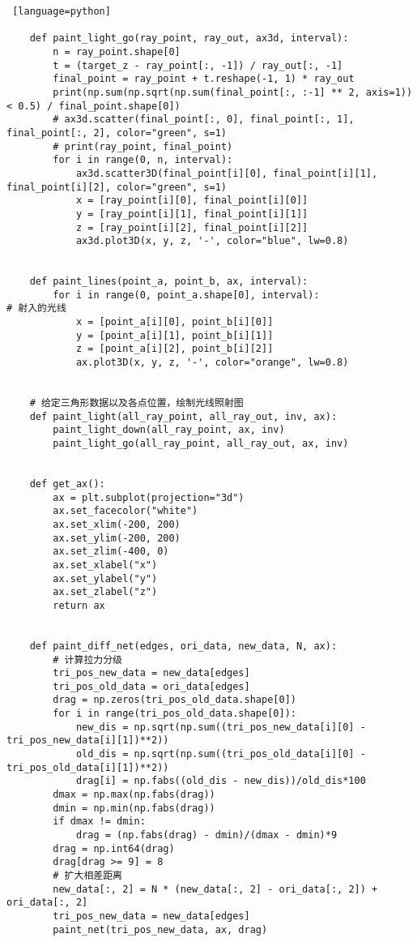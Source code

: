 \documentclass[withoutpreface,bwprint,fontset=macnew]{cumcmthesis} %
\begin{document}
\begin{appendices}
\begin{lstlisting} [language=python]
	
	def paint_light_go(ray_point, ray_out, ax3d, interval):
	    n = ray_point.shape[0]
	    t = (target_z - ray_point[:, -1]) / ray_out[:, -1]
	    final_point = ray_point + t.reshape(-1, 1) * ray_out
	    print(np.sum(np.sqrt(np.sum(final_point[:, :-1] ** 2, axis=1)) < 0.5) / final_point.shape[0])
	    # ax3d.scatter(final_point[:, 0], final_point[:, 1], final_point[:, 2], color="green", s=1)
	    # print(ray_point, final_point)
	    for i in range(0, n, interval):
	        ax3d.scatter3D(final_point[i][0], final_point[i][1], final_point[i][2], color="green", s=1)
	        x = [ray_point[i][0], final_point[i][0]]
	        y = [ray_point[i][1], final_point[i][1]]
	        z = [ray_point[i][2], final_point[i][2]]
	        ax3d.plot3D(x, y, z, '-', color="blue", lw=0.8)
	
	
	def paint_lines(point_a, point_b, ax, interval):
	    for i in range(0, point_a.shape[0], interval):                     # 射入的光线
	        x = [point_a[i][0], point_b[i][0]]
	        y = [point_a[i][1], point_b[i][1]]
	        z = [point_a[i][2], point_b[i][2]]
	        ax.plot3D(x, y, z, '-', color="orange", lw=0.8)
	
	
	# 给定三角形数据以及各点位置，绘制光线照射图
	def paint_light(all_ray_point, all_ray_out, inv, ax):
	    paint_light_down(all_ray_point, ax, inv)
	    paint_light_go(all_ray_point, all_ray_out, ax, inv)
	
	
	def get_ax():
	    ax = plt.subplot(projection="3d")
	    ax.set_facecolor("white")
	    ax.set_xlim(-200, 200)
	    ax.set_ylim(-200, 200)
	    ax.set_zlim(-400, 0)
	    ax.set_xlabel("x")
	    ax.set_ylabel("y")
	    ax.set_zlabel("z")
	    return ax
	
	
	def paint_diff_net(edges, ori_data, new_data, N, ax):
	    # 计算拉力分级
	    tri_pos_new_data = new_data[edges]
	    tri_pos_old_data = ori_data[edges]
	    drag = np.zeros(tri_pos_old_data.shape[0])
	    for i in range(tri_pos_old_data.shape[0]):
	        new_dis = np.sqrt(np.sum((tri_pos_new_data[i][0] - tri_pos_new_data[i][1])**2))
	        old_dis = np.sqrt(np.sum((tri_pos_old_data[i][0] - tri_pos_old_data[i][1])**2))
	        drag[i] = np.fabs((old_dis - new_dis))/old_dis*100
	    dmax = np.max(np.fabs(drag))
	    dmin = np.min(np.fabs(drag))
	    if dmax != dmin:
	        drag = (np.fabs(drag) - dmin)/(dmax - dmin)*9
	    drag = np.int64(drag)
	    drag[drag >= 9] = 8
	    # 扩大相差距离
	    new_data[:, 2] = N * (new_data[:, 2] - ori_data[:, 2]) + ori_data[:, 2]
	    tri_pos_new_data = new_data[edges]
	    paint_net(tri_pos_new_data, ax, drag)
	\end{lstlisting}


\end{appendices}
\end{document}
